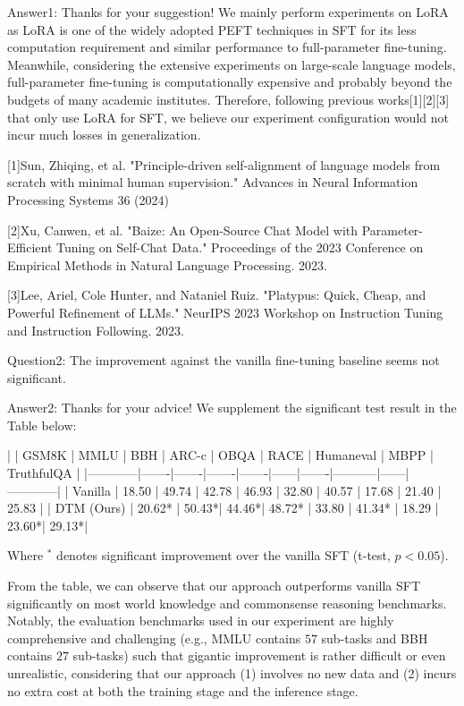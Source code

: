 Answer1: Thanks for your suggestion! We mainly perform experiments on LoRA as LoRA is one of the widely adopted PEFT techniques in SFT for its less computation requirement and similar performance to full-parameter fine-tuning. Meanwhile, considering the extensive experiments on large-scale language models, full-parameter fine-tuning is computationally expensive and probably beyond the budgets of many academic institutes. Therefore, following previous works[1][2][3] that only use LoRA for SFT, we believe our experiment configuration would not incur much losses in generalization. 

[1]Sun, Zhiqing, et al. "Principle-driven self-alignment of language models from scratch with minimal human supervision." Advances in Neural Information Processing Systems 36 (2024)

[2]Xu, Canwen, et al. "Baize: An Open-Source Chat Model with Parameter-Efficient Tuning on Self-Chat Data." Proceedings of the 2023 Conference on Empirical Methods in Natural Language Processing. 2023.

[3]Lee, Ariel, Cole Hunter, and Nataniel Ruiz. "Platypus: Quick, Cheap, and Powerful Refinement of LLMs." NeurIPS 2023 Workshop on Instruction Tuning and Instruction Following. 2023.



Question2: The improvement against the vanilla fine-tuning baseline seems not significant.

Answer2: Thanks for your advice! We supplement the significant test result in the Table below: 

|            | GSM8K | MMLU  | BBH   | ARC-c | OBQA | RACE  | Humaneval | MBPP | TruthfulQA |
|------------|-------|-------|-------|-------|------|-------|-----------|------|------------|
| Vanilla    | 18.50  | 49.74 | 42.78 | 46.93 | 32.80 | 40.57 | 17.68     | 21.40 | 25.83  |
| DTM (Ours) | 20.62* | 50.43*| 44.46*| 48.72* | 33.80 | 41.34* | 18.29 | 23.60*| 29.13*|

Where $^*$ denotes significant improvement over the vanilla SFT (t-test, $p< 0.05$).

From the table, we can observe that our approach outperforms vanilla SFT significantly on most world knowledge and commonsense reasoning benchmarks. Notably, the evaluation benchmarks used in our experiment are highly comprehensive and challenging (e.g., MMLU contains $57$ sub-tasks and BBH contains $27$ sub-tasks) such that gigantic improvement is rather difficult or even unrealistic, considering that our approach (1) involves no new data and (2) incurs no extra cost at both the training stage and the inference stage. 


